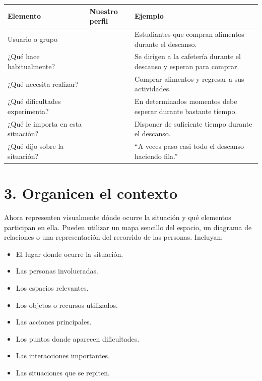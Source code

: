 \documentclass[12pt,a4paper]{article}
\begin{document}
	\begin{center}
		\small
		\begin{tabular}{|L{0.22\textwidth}|L{0.2\textwidth}|L{0.51\textwidth}|}
			\hline
			\textbf{Elemento} & \textbf{Nuestro perfil} & \textbf{Ejemplo} \\
			\hline
			Usuario o grupo 
			& \rule{0pt}{0.6cm}
			& Estudiantes que compran alimentos durante el descanso. \\
			\hline
			¿Qué hace habitualmente? 
			& \rule{0pt}{0.8cm}
			& Se dirigen a la cafetería durante el descanso y esperan para comprar. \\
			\hline
			¿Qué necesita realizar? 
			& \rule{0pt}{0.8cm}
			& Comprar alimentos y regresar a sus actividades. \\
			\hline
			¿Qué dificultades experimenta? 
			& \rule{0pt}{0.8cm}
			& En determinados momentos debe esperar durante bastante tiempo. \\
			\hline
			¿Qué le importa en esta situación? 
			& \rule{0pt}{0.8cm}
			& Disponer de suficiente tiempo durante el descanso. \\
			\hline
			¿Qué dijo sobre la situación? 
			& \rule{0pt}{0.8cm}
			& ``A veces paso casi todo el descanso haciendo fila.'' \\
			\hline
		\end{tabular}
	\end{center}
	
	\vspace{-4mm}
	\section*{3. Organicen el contexto}
	
	Ahora representen visualmente dónde ocurre la situación y qué elementos participan en ella. Pueden utilizar un mapa sencillo del espacio, un diagrama de relaciones o una representación del recorrido de las personas. Incluyan:
	
	\begin{multicols}{2}
		\begin{itemize}[leftmargin=0.6cm,itemsep=0pt]
			\item El lugar donde ocurre la situación.
			\item Las personas involucradas.
			\item Los espacios relevantes.
			\item Los objetos o recursos utilizados.
			\item Las acciones principales.
			\item Los puntos donde aparecen dificultades.
			\item Las interacciones importantes.
			\item Las situaciones que se repiten.
		\end{itemize}
	\end{multicols}
	
\end{document}
